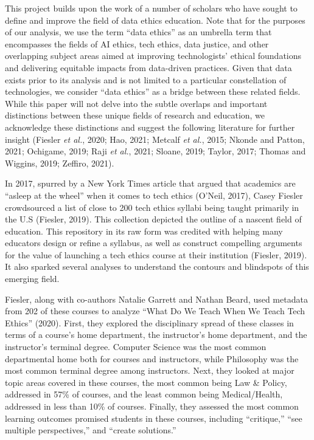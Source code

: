 \documentclass[
]{article}
\begin{document}
This project builds upon the work of a number of scholars who have
sought to define and improve the field of data ethics education. Note
that for the purposes of our analysis, we use the term ``data ethics''
as an umbrella term that encompasses the fields of AI ethics, tech
ethics, data justice, and other overlapping subject areas aimed at
improving technologists' ethical foundations and delivering equitable
impacts from data-driven practices. Given that data exists prior to its
analysis and is not limited to a particular constellation of
technologies, we consider ``data ethics'' as a bridge between these
related fields. While this paper will not delve into the subtle overlaps
and important distinctions between these unique fields of research and
education, we acknowledge these distinctions and suggest the following
literature for further insight (Fiesler \emph{et al.}, 2020; Hao, 2021;
Metcalf \emph{et al.}, 2015; Nkonde and Patton, 2021; Ochigame, 2019;
Raji \emph{et al.}, 2021; Sloane, 2019; Taylor, 2017; Thomas and
Wiggins, 2019; Zeffiro, 2021).

In 2017, spurred by a New York Times article that argued that academics
are ``asleep at the wheel'' when it comes to tech ethics (O'Neil, 2017),
Casey Fiesler crowdsourced a list of close to 200 tech ethics syllabi
being taught primarily in the U.S (Fiesler, 2019). This collection
depicted the outline of a nascent field of education. This repository in
its raw form was credited with helping many educators design or refine a
syllabus, as well as construct compelling arguments for the value of
launching a tech ethics course at their institution (Fiesler, 2019). It
also sparked several analyses to understand the contours and blindspots
of this emerging field.

Fiesler, along with co-authors Natalie Garrett and Nathan Beard, used
metadata from 202 of these courses to analyze ``What Do We Teach When We
Teach Tech Ethics'' (2020). First, they explored the disciplinary spread
of these classes in terms of a course's home department, the
instructor's home department, and the instructor's terminal degree.
Computer Science was the most common departmental home both for courses
and instructors, while Philosophy was the most common terminal degree
among instructors. Next, they looked at major topic areas covered in
these courses, the most common being Law \& Policy, addressed in 57\% of
courses, and the least common being Medical/Health, addressed in less
than 10\% of courses. Finally, they assessed the most common learning
outcomes promised students in these courses, including ``critique,''
``see multiple perspectives,'' and ``create solutions.''
\end{document}
